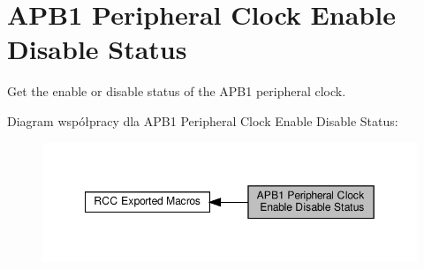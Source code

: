 \hypertarget{group___r_c_c___a_p_b1___peripheral___clock___enable___disable___status}{}\section{A\+P\+B1 Peripheral Clock Enable Disable Status}
\label{group___r_c_c___a_p_b1___peripheral___clock___enable___disable___status}


Get the enable or disable status of the A\+P\+B1 peripheral clock.  


Diagram współpracy dla A\+P\+B1 Peripheral Clock Enable Disable Status\+:\nopagebreak
\begin{figure}[H]
\begin{center}
\leavevmode
\includegraphics[width=349pt]{group___r_c_c___a_p_b1___peripheral___clock___enable___disable___status}
\end{center}
\end{figure}
